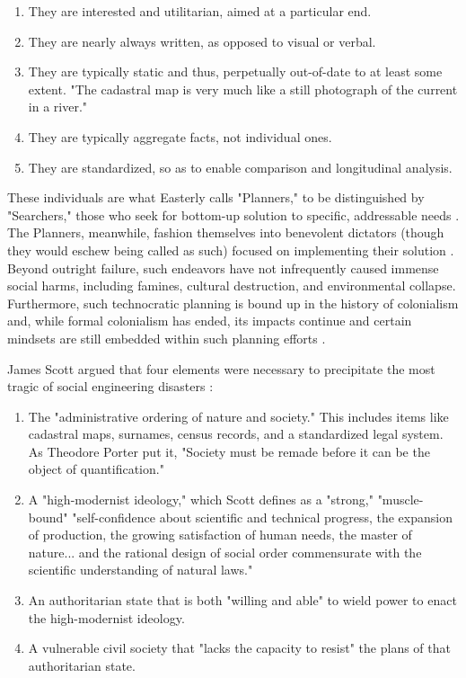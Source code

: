 \begin{enumerate} \setlength{\itemsep}{0pt} \setlength{\parskip}{0pt} 
	\item{They are interested and utilitarian, aimed at a particular end.}
	\item{They are nearly always written, as opposed to visual or verbal.}
	\item{They are typically static and thus, perpetually out-of-date to at least some extent. "The cadastral map is very much like a still photograph of the current in a river."}
	\item{They are typically aggregate facts, not individual ones.}
	\item{They are standardized, so as to enable comparison and longitudinal analysis.}
\end{enumerate}

These individuals are what Easterly calls "Planners," to be distinguished by "Searchers," those who seek for bottom-up solution to specific, addressable needs \cite{easterlyWhiteManBurden2007a}. The Planners, meanwhile, fashion themselves into benevolent dictators (though they would eschew being called as such) focused on implementing their solution \cite{easterly2015}. Beyond outright failure, such endeavors have not infrequently caused immense social harms, including famines, cultural destruction, and environmental collapse. Furthermore, such technocratic planning is bound up in the history of colonialism and, while formal colonialism has ended, its impacts continue and certain mindsets are still embedded within such planning efforts \cite{sandercockCommentaryIndigenousPlanning2004}.

James Scott argued that four elements were necessary to precipitate the most tragic of social engineering disasters \cite{scottSeeingStateHow2020}:

\begin{enumerate} \setlength{\itemsep}{0pt} \setlength{\parskip}{0pt} 
	\item{The "administrative ordering of nature and society." This includes items like cadastral maps, surnames, census records, and a standardized legal system. As Theodore Porter put it, "Society must be remade before it can be the object of quantification." \cite{porter1992objectivity}}
	\item{A "high-modernist ideology," which Scott defines as a "strong," "muscle-bound" "self-confidence about scientific and technical progress, the expansion of production, the growing satisfaction of human needs, the master of nature... and the rational design of social order commensurate with the scientific understanding of natural laws."}
	\item{An authoritarian state that is both "willing and able" to wield power to enact the high-modernist ideology.}
	\item{A vulnerable civil society that "lacks the capacity to resist" the plans of that authoritarian state.}
\end{enumerate}

